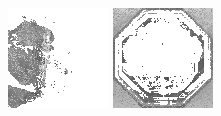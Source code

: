 \documentclass{article}
\begin{document}
\begin{figure}[t]
\begin{minipage}[c]{.21\linewidth}
  \end{minipage}
  \begin{minipage}[c]{.21\linewidth}
    \centering\centerline{\includegraphics[width=\linewidth]{imgs/dennis_cal/saxophone/sums/0_0.png}}
  \end{minipage}
  \begin{minipage}[c]{.21\linewidth}
    \centering\centerline{\includegraphics[width=\linewidth]{imgs/dennis_cal/stop/sums/0_0.png}}

\end{minipage}
\end{figure}
\end{document}
